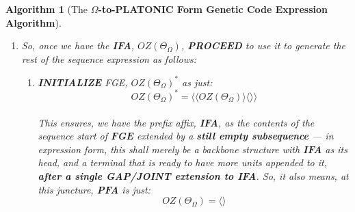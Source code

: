 \documentclass[a4paper, 18pt]{book} %
\newtheorem{alg}{Algorithm}
\begin{document}
\begin{alg}[The \textbf{$\Omega$-to-PLATONIC Form Genetic Code Expression Algorithm}]
\begin{enumerate}
{}
\item{ So, once we have the \textbf{IFA}, $OZ(\Theta_\Omega)$, \textbf{PROCEED} to use it to generate the rest of the sequence expression as follows: 
\begin{enumerate}
\item {\textbf{INITIALIZE} FGE, $\boxed{OZ(\Theta_\Omega)}^*$ as just:\\

\begin{equation}
\label{EQSTARTFGE}
\boxed{OZ(\Theta_\Omega)}^* = \langle \langle OZ(\Theta_\Omega) \rangle \langle \rangle \rangle
\end{equation}\\

This ensures, we have the prefix affix, \textbf{IFA}, as the contents of the sequence start of \textbf{FGE} \textit{extended} by a \textbf{still empty subsequence} --- in expression form, this shall merely be a backbone structure with \textbf{IFA} as its head, and a terminal that is ready to have more units appended to it, \textbf{after a single GAP/JOINT extension to IFA}. So, it also means, at this juncture, \textbf{PFA} is just:\\

\begin{equation}
\label{EQSTARTFGESUF}
\boxed{OZ(\Theta_\Omega)} = \langle \rangle
\end{equation}\\

}
\end{enumerate}}
\end{enumerate}
\end{alg}
\end{document}

